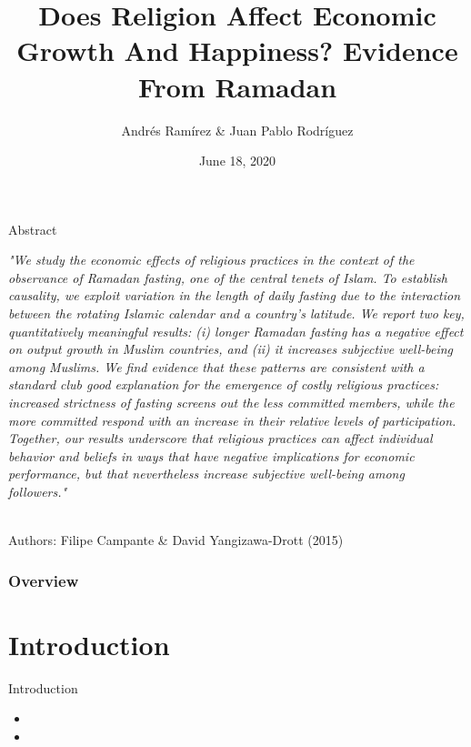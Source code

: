 \documentclass[pdftex,12pt,xcolor=pdftex,table]{beamer}
\title[Religion in Growth and Happiness]{Does Religion Affect Economic Growth And
Happiness? Evidence From Ramadan} %
\author{Andrés Ramírez \& Juan Pablo Rodríguez}
\institute[]{Summer School of Economics}
\date{June 18, 2020} %
\begin{document}
\begin{frame}
\titlepage
\end{frame}

\begin{frame}{Abstract}
\begin{footnotesize}

\textit{"We study the economic effects of religious practices in the context of the
observance of Ramadan fasting, one of the central tenets of Islam. To establish
causality, we exploit variation in the length of daily fasting due to the interaction
between the rotating Islamic calendar and a country’s latitude. We report
two key, quantitatively meaningful results: (i) longer Ramadan fasting has a
negative effect on output growth in Muslim countries, and (ii) it increases subjective
well-being among Muslims. We find evidence that these patterns are
consistent with a standard club good explanation for the emergence of costly
religious practices: increased strictness of fasting screens out the less committed
members, while the more committed respond with an increase in their
relative levels of participation. Together, our results underscore that religious
practices can affect individual behavior and beliefs in ways that have negative
implications for economic performance, but that nevertheless increase subjective
well-being among followers."}
\\\

Authors: Filipe Campante \& David Yangizawa-Drott (2015)
\end{footnotesize}
\end{frame}

\begin{frame}
\frametitle{Overview}
\tableofcontents 
\end{frame}

\section{Introduction}
    \begin{frame}{Introduction}
        \begin{itemize}
     \item<1-> \vspace {One fundamental aspect that is common to all forms of religion is that they prescribe rules of behavior, or practices, that constrain followers, with varying degrees of strictness.}
     
     \item<2-> \vspace {The recent empirical literature that has studied the relationship between religion and economic performance has found a negative correlation between religious behavior and economic growth, and between religiosity and income at the cross- country and individual levels.}
        \end{itemize}
         
    \end{frame}
    
\end{document}
